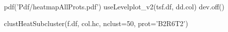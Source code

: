 \documentclass[a4paper]{article}
\begin{document}
\title{}
\author{}

\maketitle




pdf('Pdf/heatmapAllProts.pdf')
useLevelplot_v2(tsf.df, dd.col)
dev.off()

clustHeatSubcluster(f.df, col.hc, nclust=50, prot='B2R6T2')
\end{document}
